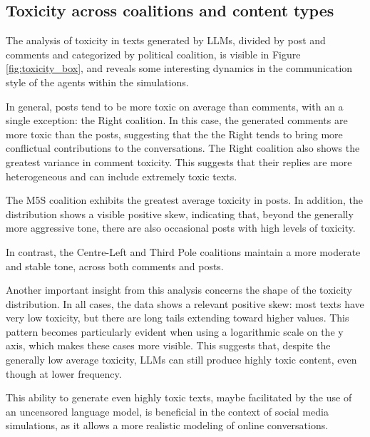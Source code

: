 \subsection{Toxicity across coalitions and content types}
The analysis of toxicity in texts generated by LLMs, divided by post and comments and categorized by political coalition, is visible in Figure \ref{fig:toxicity_box}, and reveals some interesting dynamics in the communication style of the agents within the simulations.

In general, posts tend to be more toxic on average than comments, with an a single exception: the Right coalition.
In this case, the generated comments are more toxic than the posts, suggesting that the the Right tends to bring more conflictual contributions to the conversations.
The Right coalition also shows the greatest variance in comment toxicity.
This suggests that their replies are more heterogeneous and can include extremely toxic texts.

The M5S coalition exhibits the greatest average toxicity in posts.
In addition, the distribution shows a visible positive skew, indicating that, beyond the generally more aggressive tone, there are also occasional posts with high levels of toxicity.

In contrast, the Centre-Left and Third Pole coalitions maintain a more moderate and stable tone, across both comments and posts.

Another important insight from this analysis concerns the shape of the toxicity distribution.
In all cases, the data shows a relevant positive skew: most texts have very low toxicity, but there are long tails extending toward higher values.
This pattern becomes particularly evident when using a logarithmic scale on the y axis, which makes these cases more visible.
This suggests that, despite the generally low average toxicity, LLMs can still produce highly toxic content, even though at lower frequency.

This ability to generate even highly toxic texts, maybe facilitated by the use of an uncensored language model, is beneficial in the context of social media simulations, as it allows a more realistic modeling of online conversations.


